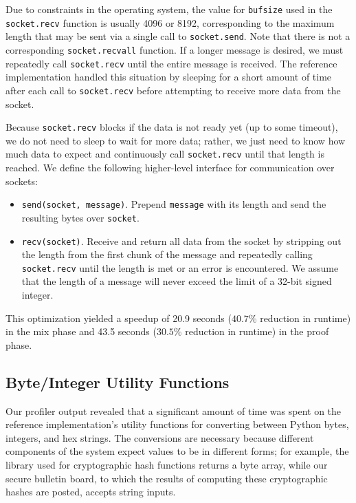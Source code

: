 Due to constraints in the operating system, the value for \texttt{bufsize} used in the \texttt{socket.recv} function is usually 4096 or 8192, corresponding to the maximum length that may be sent via a single call to \texttt{socket.send}. Note that there is not a corresponding \texttt{socket.recvall} function. If a longer message is desired, we must repeatedly call \texttt{socket.recv} until the entire message is received. The reference implementation handled this situation by sleeping for a short amount of time after each call to \texttt{socket.recv} before attempting to receive more data from the socket.

Because \texttt{socket.recv} blocks if the data is not ready yet (up to some timeout), we do not need to sleep to wait for more data; rather, we just need to know how much data to expect and continuously call \texttt{socket.recv} until that length is reached. We define the following higher-level interface for communication over sockets:
\begin{itemize}
\item \texttt{send(socket, message)}. Prepend \texttt{message} with its length and send the resulting bytes over \texttt{socket}.
\item \texttt{recv(socket)}. Receive and return all data from the socket by stripping out the length from the first chunk of the message and repeatedly calling \texttt{socket.recv} until the length is met or an error is encountered. We assume that the length of a message will never exceed the limit of a 32-bit signed integer.
\end{itemize}

This optimization yielded a speedup of 20.9 seconds ($40.7\%$ reduction in runtime) in the mix phase and 43.5 seconds ($30.5\%$ reduction in runtime) in the proof phase.

\subsection{Byte/Integer Utility Functions} \label{perf:optimizations:byteint}

Our profiler output revealed that a significant amount of time was spent on the reference implementation's utility functions for converting between Python bytes, integers, and hex strings. The conversions are necessary because different components of the system expect values to be in different forms; for example, the library used for cryptographic hash functions returns a byte array, while our secure bulletin board, to which the results of computing these cryptographic hashes are posted, accepts string inputs.

